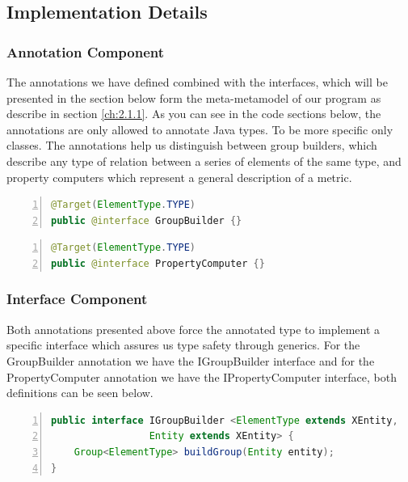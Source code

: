 \subsection{Implementation Details}

\subsubsection{Annotation Component}

	The annotations we have defined combined with the interfaces, which will be
presented in the section below form the meta-metamodel of our program as
describe in section \ref{ch:2.1.1}.
	As you can see in the code sections below, the annotations are only allowed to
annotate {J}ava types. To be more specific only classes. The annotations help us
distinguish between group builders, which describe any type of relation between a series of elements of the same type, 
and property computers which represent a general description of a metric. 

		\small
	\begin{lstlisting}[language=Java,numbers=left]
@Target(ElementType.TYPE)
public @interface GroupBuilder {}	
	\end{lstlisting}
	\normalsize{} \label{codeSection:GroupBuild}
	
		\small
	\begin{lstlisting}[language=Java,numbers=left]
@Target(ElementType.TYPE)
public @interface PropertyComputer {}
	\end{lstlisting}
	\normalsize{} \label{codeSection:PropertyComputer} 

\subsubsection{Interface Component}

	Both annotations presented above force the annotated type to implement a
specific interface which assures us type safety through generics. For the
GroupBuilder annotation we have the IGroupBuilder interface and for the
PropertyComputer annotation we have the IPropertyComputer interface, both
definitions can be seen below.

	\small
	\begin{lstlisting}[language=Java,numbers=left]
public interface IGroupBuilder <ElementType extends XEntity, 
                 Entity extends XEntity> {
	Group<ElementType> buildGroup(Entity entity);
}
	\end{lstlisting}
	\normalsize{} \label{codeSection:IGroupBuilder}
	
